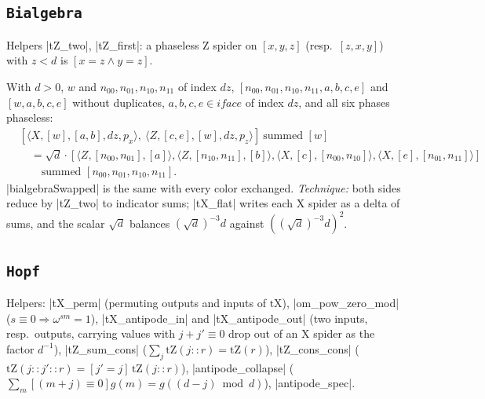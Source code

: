 \subsection{\texttt{Bialgebra}}

Helpers \lean|tZ_two|, \lean|tZ_first|: a phaseless Z spider on $[x,y,z]$ (resp.\ $[z,x,y]$) with
$z<d$ is $[x=z\land y=z]$.

\begin{lemma}
With $d>0$, $w$ and $n_{00},n_{01},n_{10},n_{11}$ of index $dz$, $[n_{00},n_{01},n_{10},n_{11},a,b,c,e]$
and $[w,a,b,c,e]$ without duplicates, $a,b,c,e\in\mathit{iface}$ of index $dz$, and all six phases
phaseless:
\[\begin{aligned}
&[\langle X,[w],[a,b],dz,p_x\rangle,\ \langle Z,[c,e],[w],dz,p_z\rangle]\ \text{summed }[w]\\
&\quad=\sqrt d\cdot[\langle Z,[n_{00},n_{01}],[a]\rangle,\langle Z,[n_{10},n_{11}],[b]\rangle,
\langle X,[c],[n_{00},n_{10}]\rangle,\langle X,[e],[n_{01},n_{11}]\rangle]\\
&\qquad\text{summed }[n_{00},n_{01},n_{10},n_{11}].
\end{aligned}\]
\lean|bialgebraSwapped| is the same with every color exchanged. \emph{Technique:} both sides reduce
by \lean|tZ_two| to indicator sums; \lean|tX_flat| writes each X spider as a delta of sums, and the
scalar $\sqrt d$ balances $(\sqrt d)^{-3}d$ against $((\sqrt d)^{-3}d)^2$.
\end{lemma}

\subsection{\texttt{Hopf}}

Helpers: \lean|tX_perm| (permuting outputs and inputs of $\mathrm{tX}$), \lean|om_pow_zero_mod|
($s\equiv0\Rightarrow\omega^{sm}=1$), \lean|tX_antipode_in| and \lean|tX_antipode_out| (two inputs,
resp.\ outputs, carrying values with $j+j'\equiv0$ drop out of an X spider as the factor $d^{-1}$),
\lean|tZ_sum_cons| ($\sum_j\mathrm{tZ}(j{::}r)=\mathrm{tZ}(r)$), \lean|tZ_cons_cons|
($\mathrm{tZ}(j{::}j'{::}r)=[j'=j]\,\mathrm{tZ}(j{::}r)$), \lean|antipode_collapse|
($\sum_m[(m+j)\equiv0]g(m)=g((d-j)\bmod d)$), \lean|antipode_spec|.

